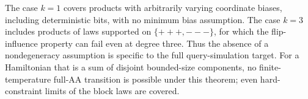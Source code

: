 The case \(k=1\) covers products with arbitrarily varying coordinate
biases, including deterministic bits, with no minimum bias assumption.
The case \(k=3\) includes products of laws supported on
\(\{+++ ,---\}\), for which the flip-influence property can fail even
at degree three. Thus the absence of a nondegeneracy assumption is
specific to the full query-simulation target. For a Hamiltonian that
is a sum of disjoint bounded-size components, no finite-temperature
full-AA transition is possible under this theorem; even hard-constraint
limits of the block laws are covered.
